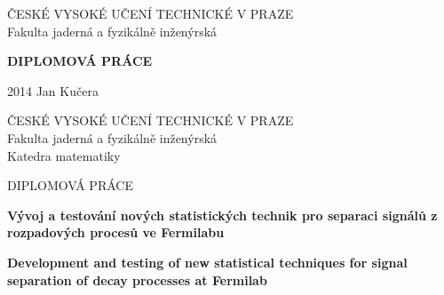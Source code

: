 
\thispagestyle{empty}

\begin{center}

{\Large ČESKÉ VYSOKÉ UČENÍ TECHNICKÉ V PRAZE} \\[3.5mm]
{\Large Fakulta jaderná a fyzikálně inženýrská}


{\Huge\textbf{DIPLOMOVÁ PRÁCE}}


{\Large \hspace*{1cm} 2014 \hfill Jan Kučera\hspace*{1cm}}

\end{center}


\newpage

\thispagestyle{empty}

\begin{center}

{\Large ČESKÉ VYSOKÉ UČENÍ TECHNICKÉ V PRAZE} \\[3.5mm]
{\Large Fakulta jaderná a fyzikálně inženýrská} \\[3.5mm]
{\Large Katedra matematiky}


{\Large DIPLOMOVÁ PRÁCE}


{\LARGE
\textbf{Vývoj a testování nových statistických technik pro separaci signálů z rozpadových procesů ve Fermilabu}
\par}

\vspace{1cm}

{\LARGE
\textbf{Development and testing of new statistical techniques for signal separation of decay processes at Fermilab}
\par}


\end{center}


